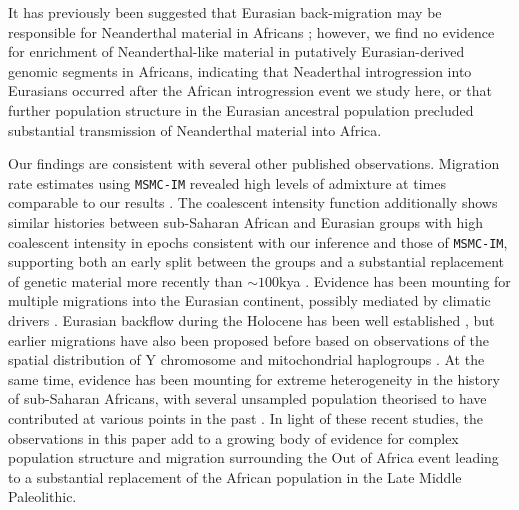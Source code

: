 It has previously been suggested that Eurasian back-migration may be responsible for Neanderthal material in Africans \cite{Chen2020}; however, we find no evidence for enrichment of Neanderthal-like material in putatively Eurasian-derived genomic segments in Africans, indicating that Neaderthal introgression into Eurasians occurred after the African introgression event we study here, or that further population structure in the Eurasian ancestral population precluded substantial transmission of Neanderthal material into Africa.

Our findings are consistent with several other published observations. Migration rate estimates using {\tt MSMC-IM} revealed high levels of admixture at times comparable to our results \cite{Wang2019a}. The coalescent intensity function additionally shows similar histories between sub-Saharan African and Eurasian groups with high coalescent intensity in epochs consistent with our inference and those of {\tt MSMC-IM}, supporting both an early split between the groups and a substantial replacement of genetic material more recently than $\sim100$kya \cite{Albers2019}. Evidence has been mounting for multiple migrations into the Eurasian continent, possibly mediated by climatic drivers \cite{Timmermann2016, Pagani2016}. Eurasian backflow during the Holocene has been well established \cite{Lopez2015, GallegoLlorente2015}, but earlier migrations have also been proposed before based on observations of the spatial distribution of Y chromosome and mitochondrial haplogroups \cite{Altheide1997, Hammer1998, Cruciani2002, Chandrasekar2007, Cabrera2018, Hervella2016, Haber2019}. At the same time, evidence has been mounting for extreme heterogeneity in the history of sub-Saharan Africans, with several unsampled population theorised to have contributed at various points in the past \cite{Lipson2019, Durvasula2019, Speidel2019}. In light of these recent studies, the observations in this paper add to a growing body of evidence for complex population structure and migration surrounding the Out of Africa event leading to a substantial replacement of the African population in the Late Middle Paleolithic.  

